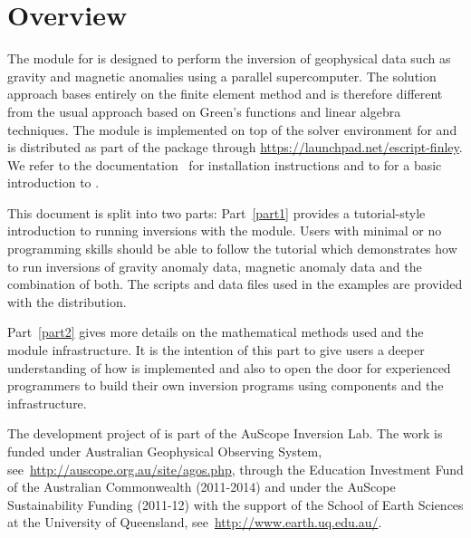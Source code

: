 
%
%
%


\chapter*{Overview}\label{sec:Intro}
The \downunder module for \Python is designed to perform the inversion of
geophysical data such as gravity and magnetic anomalies using a parallel
supercomputer.
The solution approach bases entirely on the finite element method and is
therefore different from the usual approach based on Green's functions
and linear algebra techniques.
The module is implemented on top of the \escript solver environment for
\Python and is distributed as part of the \escript package through
\url{https://launchpad.net/escript-finley}.
We refer to the \escript documentation~\cite{ESCRIPT} for installation
instructions and to \cite{ESCRIPTCOOKBOOK} for a basic introduction to \escript.

This document is split into two parts:
Part~\ref{part1} provides a tutorial-style introduction to running inversions
with the \downunder module.
Users with minimal or no programming skills should be able to follow the
tutorial which demonstrates how to run inversions of gravity anomaly data,
magnetic anomaly data and the combination of both.
The scripts and data files used in the examples are provided with the \escript
distribution.

Part~\ref{part2} gives more details on the mathematical methods used and the
module infrastructure.
It is the intention of this part to give users a deeper understanding of how
\downunder is implemented and also to open the door for experienced \Python
programmers to build their own inversion programs using \downunder components
and the \escript infrastructure. 

The development project of \downunder is part of the AuScope Inversion Lab. The work is funded 
under Australian Geophysical Observing System, 
see~\url{http://auscope.org.au/site/agos.php}, through the Education Investment Fund of
the Australian Commonwealth (2011-2014) and under the AuScope Sustainability Funding (2011-12)
with the support of the School of Earth Sciences at the University of Queensland, see~\url{http://www.earth.uq.edu.au/}.
